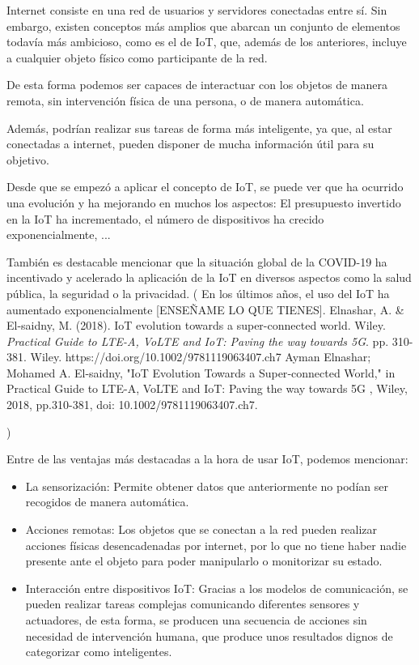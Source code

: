 \documentclass[12pt, a4paper, twoside]{article}
\begin{document}
Internet consiste en una red de usuarios y servidores conectadas entre sí.
Sin embargo, existen conceptos más amplios que abarcan un conjunto de elementos todavía más ambicioso,
como es el de IoT, que, además de los anteriores, incluye a cualquier objeto físico como participante de la red.

De esta forma podemos ser capaces de interactuar con los objetos de manera remota, sin intervención física de
una persona, o de manera automática.

Además, podrían realizar sus tareas de forma más inteligente, ya que, al estar conectadas a internet, pueden
disponer de mucha información útil para su objetivo.

Desde que se empezó a aplicar el concepto de IoT, se puede ver que ha ocurrido una evolución y ha mejorando en
muchos los aspectos: El presupuesto invertido en la IoT ha incrementado, el número de dispositivos ha crecido
exponencialmente, ...

También es destacable mencionar que la situación global de la COVID-19 ha incentivado y acelerado la aplicación
de la IoT en diversos aspectos como la salud pública, la seguridad o la privacidad.
(
En los últimos años, el uso del IoT ha aumentado exponencialmente [ENSEÑAME LO QUE TIENES].
Elnashar, A. \& El-saidny, M. (2018). IoT evolution towards a super-connected world. Wiley. \textit{Practical Guide to LTE-A, VoLTE and IoT: Paving the way towards 5G}. pp. 310-381. Wiley. https://doi.org/10.1002/9781119063407.ch7
Ayman Elnashar; Mohamed A. El-saidny, "IoT Evolution Towards a Super‐connected World," in Practical Guide to LTE-A, VoLTE and IoT: Paving the way towards 5G , Wiley, 2018, pp.310-381, doi: 10.1002/9781119063407.ch7.

)

Entre de las ventajas más destacadas a la hora de usar IoT, podemos mencionar:
\begin{itemize}
    \item La sensorización: Permite obtener datos que anteriormente no podían ser recogidos de manera automática.
    \item Acciones remotas: Los objetos que se conectan a la red pueden realizar acciones físicas desencadenadas por internet,
      por lo que no tiene haber nadie presente ante el objeto para poder manipularlo o monitorizar su estado.
    \item Interacción entre dispositivos IoT: Gracias a los modelos de comunicación, se pueden realizar tareas complejas
      comunicando diferentes sensores y actuadores, de esta forma, se producen una secuencia de acciones sin necesidad
      de intervención humana, que produce unos resultados dignos de categorizar como inteligentes.
\end{itemize}
\end{document}
